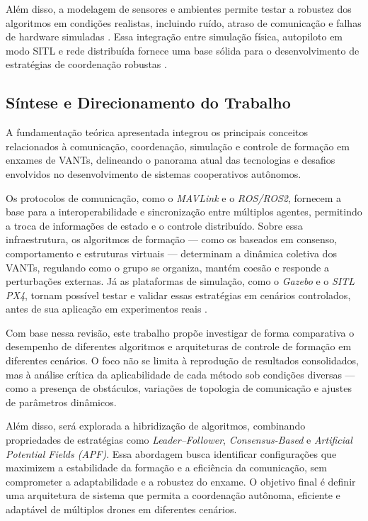 Além disso, a modelagem de sensores e ambientes permite testar a robustez dos algoritmos em condições realistas, incluindo ruído, atraso de comunicação e falhas de hardware simuladas \citep{ziming2023, PX4SITL2024}. Essa integração entre simulação física, autopiloto em modo SITL e rede distribuída fornece uma base sólida para o desenvolvimento de estratégias de coordenação robustas \citep{Ponniah2019, Noori2017}.



\subsection{Síntese e Direcionamento do Trabalho}

A fundamentação teórica apresentada integrou os principais conceitos relacionados à comunicação, coordenação, simulação e controle de formação em enxames de VANTs, delineando o panorama atual das tecnologias e desafios envolvidos no desenvolvimento de sistemas cooperativos autônomos.

Os protocolos de comunicação, como o \textit{MAVLink} e o \textit{ROS/ROS2}, fornecem a base para a interoperabilidade e sincronização entre múltiplos agentes, permitindo a troca de informações de estado e o controle distribuído. Sobre essa infraestrutura, os algoritmos de formação — como os baseados em consenso, comportamento e estruturas virtuais — determinam a dinâmica coletiva dos VANTs, regulando como o grupo se organiza, mantém coesão e responde a perturbações externas. Já as plataformas de simulação, como o \textit{Gazebo} e o \textit{SITL PX4}, tornam possível testar e validar essas estratégias em cenários controlados, antes de sua aplicação em experimentos reais \citep{ouyang2023formation, bu2024advancement, khaliq2021}.

Com base nessa revisão, este trabalho propõe investigar de forma comparativa o desempenho de diferentes algoritmos e arquiteturas de controle de formação em diferentes cenários. O foco não se limita à reprodução de resultados consolidados, mas à análise crítica da aplicabilidade de cada método sob condições diversas — como a presença de obstáculos, variações de topologia de comunicação e ajustes de parâmetros dinâmicos.

Além disso, será explorada a hibridização de algoritmos, combinando propriedades de estratégias como \textit{Leader–Follower}, \textit{Consensus-Based} e \textit{Artificial Potential Fields (APF)}. Essa abordagem busca identificar configurações que maximizem a estabilidade da formação e a eficiência da comunicação, sem comprometer a adaptabilidade e a robustez do enxame. O objetivo final é definir uma arquitetura de sistema que permita a coordenação autônoma, eficiente e adaptável de múltiplos drones em diferentes cenários.



